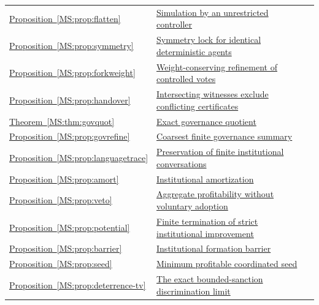 \documentclass[11pt,oneside,openany]{book}
\numberwithin{equation}{section}
\begin{document}
\begin{longtable}{@{}P{.19\linewidth}P{.69\linewidth}r@{}}
\hyperref[MS:prop:flatten]{Proposition~\ref*{MS:prop:flatten}} & \hyperref[MS:prop:flatten]{Simulation by an unrestricted controller} & \pageref{MS:prop:flatten}\\
\hyperref[MS:prop:symmetry]{Proposition~\ref*{MS:prop:symmetry}} & \hyperref[MS:prop:symmetry]{Symmetry lock for identical deterministic agents} & \pageref{MS:prop:symmetry}\\
\hyperref[MS:prop:forkweight]{Proposition~\ref*{MS:prop:forkweight}} & \hyperref[MS:prop:forkweight]{Weight-conserving refinement of controlled votes} & \pageref{MS:prop:forkweight}\\
\hyperref[MS:prop:handover]{Proposition~\ref*{MS:prop:handover}} & \hyperref[MS:prop:handover]{Intersecting witnesses exclude conflicting certificates} & \pageref{MS:prop:handover}\\
\hyperref[MS:thm:govquot]{Theorem~\ref*{MS:thm:govquot}} & \hyperref[MS:thm:govquot]{Exact governance quotient} & \pageref{MS:thm:govquot}\\
\hyperref[MS:prop:govrefine]{Proposition~\ref*{MS:prop:govrefine}} & \hyperref[MS:prop:govrefine]{Coarsest finite governance summary} & \pageref{MS:prop:govrefine}\\
\hyperref[MS:prop:languagetrace]{Proposition~\ref*{MS:prop:languagetrace}} & \hyperref[MS:prop:languagetrace]{Preservation of finite institutional conversations} & \pageref{MS:prop:languagetrace}\\
\hyperref[MS:prop:amort]{Proposition~\ref*{MS:prop:amort}} & \hyperref[MS:prop:amort]{Institutional amortization} & \pageref{MS:prop:amort}\\
\hyperref[MS:prop:veto]{Proposition~\ref*{MS:prop:veto}} & \hyperref[MS:prop:veto]{Aggregate profitability without voluntary adoption} & \pageref{MS:prop:veto}\\
\hyperref[MS:prop:potential]{Proposition~\ref*{MS:prop:potential}} & \hyperref[MS:prop:potential]{Finite termination of strict institutional improvement} & \pageref{MS:prop:potential}\\
\hyperref[MS:prop:barrier]{Proposition~\ref*{MS:prop:barrier}} & \hyperref[MS:prop:barrier]{Institutional formation barrier} & \pageref{MS:prop:barrier}\\
\hyperref[MS:prop:seed]{Proposition~\ref*{MS:prop:seed}} & \hyperref[MS:prop:seed]{Minimum profitable coordinated seed} & \pageref{MS:prop:seed}\\
\hyperref[MS:prop:deterrence-tv]{Proposition~\ref*{MS:prop:deterrence-tv}} & \hyperref[MS:prop:deterrence-tv]{The exact bounded-sanction discrimination limit} & \pageref{MS:prop:deterrence-tv}\\

\end{longtable}
\end{document}
